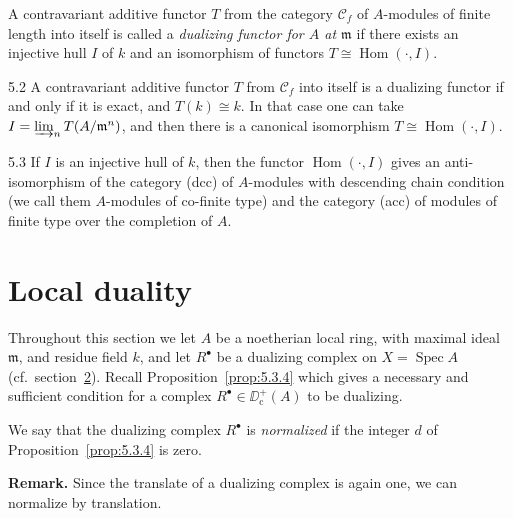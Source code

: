 \begin{definition*}
A contravariant additive functor $T$ from the category $\mathcal{C}_f$ of $A$-modules of finite length into itself is called a \emph{dualizing functor for $A$ at $\mathfrak{m}$} if there exists an injective hull $I$ of $k$ and an isomorphism of functors $T\cong\operatorname{Hom}(\cdot, I)$.
\end{definition*}

\begin{bookproposition}{5.2}\label{prop:5.5.2}
A contravariant additive functor $T$ from $\mathcal{C}_f$ into itself is a dualizing functor if and only if it is exact, and $T(k)\cong k$. In that case one can take $I=\varinjlim_n T(A/\mathfrak{m}^n)$, and then there is a canonical isomorphism $T\cong\operatorname{Hom}(\cdot, I)$.
\end{bookproposition}

\begin{bookproposition}{5.3}\label{prop:5.5.3}
If $I$ is an injective hull of $k$, then the functor $\operatorname{Hom}(\cdot,I)$ gives an anti-isomorphism of the category (dcc) of $A$-modules with descending chain condition (we call them $A$-modules of co-finite type) and the category (acc) of modules of finite type over the completion of $A$.
\end{bookproposition}

\section{Local duality}\label{sec:5.6}

Throughout this section we let $A$ be a noetherian local ring, with maximal ideal $\mathfrak{m}$, and residue field $k$, and let $R^\bullet$ be a dualizing complex on $X=\operatorname{Spec}A$ (cf.\ section~\hyperref[sec:5.2]{2}). Recall Proposition~\ref{prop:5.3.4} which gives a necessary and sufficient condition for a complex $R^\bullet\in\DD^+_{\mathrm{c}}(A)$ to be dualizing.

\begin{definition*}
We say that the dualizing complex $R^\bullet$ is \emph{normalized} if the integer $d$ of Proposition~\ref{prop:5.3.4} is zero.
\end{definition*}

\par\medskip\noindent\textbf{Remark.}
Since the translate of a dualizing complex is again one, we can normalize by translation.
\par\medskip

